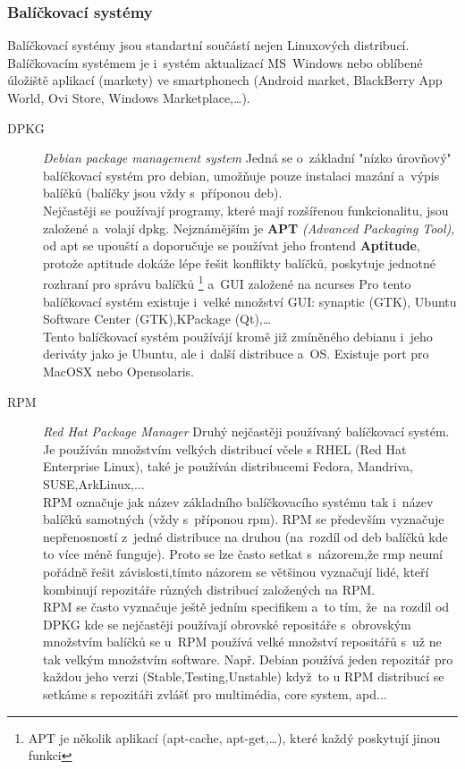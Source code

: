 \documentclass[a4paper,12pt]{article}
\renewcommand{\b}[1]{\textbf{#1}} %
\renewcommand{\it}[1]{\textit{#1}}		%
\begin{document}
\subsubsection{Balíčkovací systémy}
Balíčkovací systémy jsou standartní součástí nejen Linuxových distribucí. Balíčkovacím systémem je i~systém aktualizací MS Windows nebo oblíbené úložiště aplikací (markety) ve smartphonech (Android market, BlackBerry App World, Ovi Store, Windows Marketplace,…).
\begin{description}
 \item[DPKG] \it{Debian package management system} Jedná se o~základní "nízko úrovňový" balíčkovací systém pro debian, umožňuje pouze instalaci mazání a~výpis balíčků (balíčky jsou vždy s~příponou deb).\\
Nejčastěji se používají programy, které mají rozšířenou funkcionalitu, jsou založené a~volají dpkg. Nejznámějším je \b{APT} \it{(Advanced Packaging Tool)}\cite{DPKG}, od apt se upouští a doporučuje se používat jeho frontend \b{Aptitude}, protože aptitude dokáže lépe řešit konflikty balíčků, poskytuje jednotné rozhraní pro správu balíčků
\footnote{APT je několik aplikací (apt-cache, apt-get,…), které každý poskytují jinou funkci} a~GUI založené na ncurses Pro tento balíčkovací systém existuje i~velké množství GUI: synaptic (GTK), Ubuntu Software Center (GTK),KPackage (Qt),…\\
Tento balíčkovací systém používájí kromě již zmíněného debianu i~jeho deriváty jako je Ubuntu, ale i~další distribuce a~OS. Existuje port pro MacOSX nebo Opensolaris\cite{DPKG}.
 \item[RPM] \it{Red Hat Package Manager} Druhý nejčastěji používaný balíčkovací systém. Je používán množstvím velkých distribucí včele s RHEL (Red Hat Enterprise Linux), také je používán distribucemi Fedora, Mandriva, SUSE,ArkLinux,...\\
RPM označuje jak název základního balíčkovacího systému tak i~název balíčků samotných (vždy s~příponou rpm). RPM se především vyznačuje nepřenosností z~jedné distribuce na druhou (na~rozdíl od deb balíčků kde to více méně funguje). Proto se lze často setkat s~názorem,že rmp neumí pořádně řešit závislosti,tímto názorem se většinou vyznačují lidé, kteří kombinují repozitáře různých distribucí založených na RPM.\\
RPM se často vyznačuje ještě jedním specifikem a~to tím, že~na rozdíl od DPKG kde se nejčastěji používají obrovské repositáře s~obrovským množstvím balíčků se u~RPM používá velké množství repositářů s~už ne tak velkým množstvím software. Např. Debian používá jeden repozitář pro každou jeho verzi (Stable,Testing,Unstable) když~to u RPM distribucí se setkáme s repozitáři zvlášť pro multimédia, core system, apd...\\

\end{description}
\end{document}
